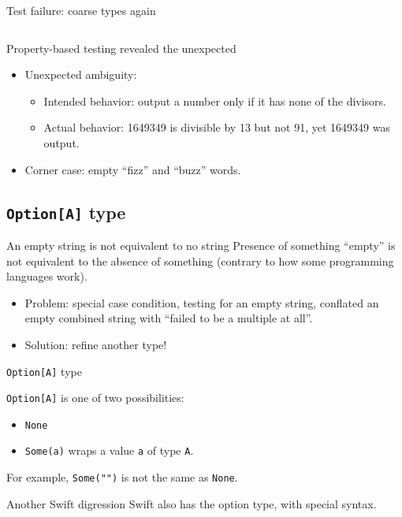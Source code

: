 \begin{frame}[fragile]{Test failure: coarse types again}
  \inputminted[gobble=2]{console}{testQuick9.console}

  \begin{block}{Property-based testing revealed the \alert{unexpected}}
  \begin{itemize}
  \item Unexpected ambiguity:
    \begin{itemize}
    \item Intended behavior: output a number only if it has none of the divisors.
    \item Actual behavior: 1649349 is divisible by 13 but not 91, yet 1649349 was output.
    \end{itemize}
  \item Corner case: empty ``fizz'' and ``buzz'' words.
  \end{itemize}
  \end{block}
\end{frame}

\subsection{\texttt{Option[A]} type}

\begin{frame}{An empty string is \alert{not} equivalent to no string}
  Presence of something ``empty'' is \alert{not} equivalent to the absence of something (contrary to how some programming languages work).

  \begin{itemize}
  \item Problem: special case condition, testing for an empty string, conflated an empty combined string with ``failed to be a multiple at all''.
  \item Solution: refine another \alert{type}!
  \end{itemize}
\end{frame}

\begin{frame}[fragile]{\texttt{Option[A]} type}

  \texttt{Option[A]} is one of two possibilities:
  \begin{itemize}
  \item \texttt{None}
  \item \texttt{Some(a)} wraps a value \texttt{a} of type \texttt{A}.
  \end{itemize}

  For example, \texttt{Some("")} is not the same as \texttt{None}.

  \begin{block}{Another Swift digression}
    Swift also has the option type, with special syntax.
  \end{block}

\end{frame}

